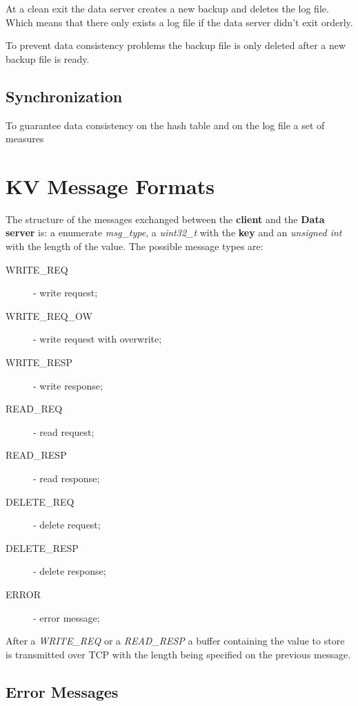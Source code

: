 \documentclass[12pt]{article} %
\begin{document}
At a clean exit the data server creates a new backup and deletes the log file. Which means that there only exists a log file if the data server didn't exit orderly.

To prevent data consistency problems the backup file is only deleted after a new backup file is ready.



\subsection{Synchronization}
\label{sub:Synchronization}

To guarantee data consistency on the hash table and on the log file a set of measures


\section{KV Message Formats}

The structure of the messages exchanged between the \textbf{client} and the \textbf{Data server} is:  a  enumerate \emph{msg\_type}, a \emph{uint32\_t} with the \textbf{key} and an \emph{unsigned int} with the length of the value. The possible message types are:
\begin{description}
    \item[WRITE\_REQ] - write request;
    \item[WRITE\_REQ\_OW] - write request with overwrite;
    \item[WRITE\_RESP] - write response;
    \item[READ\_REQ] - read request;
    \item[READ\_RESP] - read response;
    \item[DELETE\_REQ] - delete request;
    \item[DELETE\_RESP] - delete response;
    \item[ERROR] - error message;
\end{description}
After a \emph{WRITE\_REQ} or a \emph{READ\_RESP} a buffer containing the value to store is transmitted over TCP with the length being specified on the previous message.


\subsection{Error Messages}
\label{sub:ErrorMessages}
\end{document}

